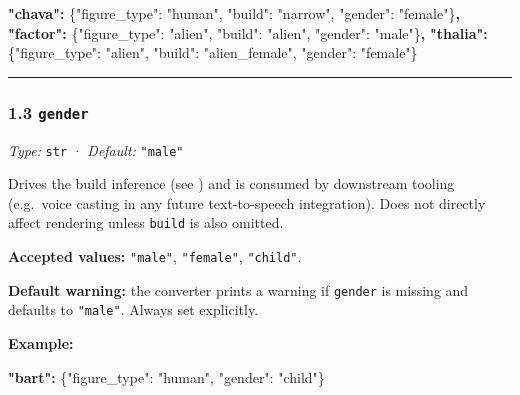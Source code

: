 \documentclass[
  11pt,
]{book}
\newenvironment{Shaded}{}{}
\newcommand{\DataTypeTok}[1]{\textcolor[rgb]{0.56,0.13,0.00}{#1}}
\newcommand{\ErrorTok}[1]{\textcolor[rgb]{1.00,0.00,0.00}{\textbf{#1}}}
\newcommand{\FunctionTok}[1]{\textcolor[rgb]{0.02,0.16,0.49}{#1}}
\newcommand{\StringTok}[1]{\textcolor[rgb]{0.25,0.44,0.63}{#1}}
\begin{document}
\begin{Shaded}
\begin{Highlighting}[]
\ErrorTok{"chava":}  \FunctionTok{\{}\DataTypeTok{"figure\_type"}\FunctionTok{:} \StringTok{"human"}\FunctionTok{,} \DataTypeTok{"build"}\FunctionTok{:} \StringTok{"narrow"}\FunctionTok{,} \DataTypeTok{"gender"}\FunctionTok{:} \StringTok{"female"}\FunctionTok{\}}\ErrorTok{,}
\ErrorTok{"factor":} \FunctionTok{\{}\DataTypeTok{"figure\_type"}\FunctionTok{:} \StringTok{"alien"}\FunctionTok{,} \DataTypeTok{"build"}\FunctionTok{:} \StringTok{"alien"}\FunctionTok{,}  \DataTypeTok{"gender"}\FunctionTok{:} \StringTok{"male"}\FunctionTok{\}}\ErrorTok{,}
\ErrorTok{"thalia":} \FunctionTok{\{}\DataTypeTok{"figure\_type"}\FunctionTok{:} \StringTok{"alien"}\FunctionTok{,} \DataTypeTok{"build"}\FunctionTok{:} \StringTok{"alien\_female"}\FunctionTok{,} \DataTypeTok{"gender"}\FunctionTok{:} \StringTok{"female"}\FunctionTok{\}}
\end{Highlighting}
\end{Shaded}

\begin{center}\rule{0.5\linewidth}{0.5pt}\end{center}

\subsubsection{\texorpdfstring{1.3
\texttt{gender}}{1.3 gender}}\label{gender}

\emph{Type:} \texttt{str} · \emph{Default:} \texttt{"male"}

Drives the build inference (see \cite{build})
and is
consumed by downstream tooling (e.g.~voice casting in any future
text-to-speech integration). Does not directly affect rendering unless
\texttt{build} is also omitted.

\textbf{Accepted values:} \texttt{"male"}, \texttt{"female"},
\texttt{"child"}.

\textbf{Default warning:} the converter prints a warning if
\texttt{gender} is missing and defaults to \texttt{"male"}. Always set
explicitly.

\textbf{Example:}

\begin{Shaded}
\begin{Highlighting}[]
\ErrorTok{"bart":} \FunctionTok{\{}\DataTypeTok{"figure\_type"}\FunctionTok{:} \StringTok{"human"}\FunctionTok{,} \DataTypeTok{"gender"}\FunctionTok{:} \StringTok{"child"}\FunctionTok{\}}
\end{Highlighting}
\end{Shaded}
\end{document}

